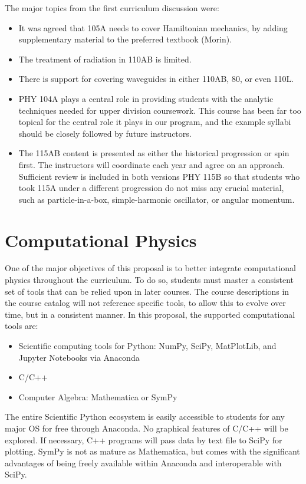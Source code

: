 \documentclass[12pt]{article}
\begin{document}
The major topics from the first curriculum discussion were:
\begin{itemize}
 \item It was agreed that 105A needs to cover Hamiltonian mechanics, by
   adding supplementary material to the preferred textbook (Morin).
 \item The treatment of radiation in 110AB is limited.
 \item There is support for covering waveguides in either 110AB, 80, or even 110L.   
 \item PHY 104A plays a central role in providing students with the
   analytic techniques needed for upper division coursework.  This
   course has been far too topical for the central role it plays in
   our program, and the example syllabi should be closely followed by
   future instructors.
 \item The 115AB content is presented as either the historical
   progression or spin first.  The instructors will coordinate each
   year and agree on an approach.  Sufficient review is included in
   both versions PHY 115B so that students who took 115A under a
   different progression do not miss any crucial material, such as
   particle-in-a-box, simple-harmonic oscillator, or angular momentum.

   
\end{itemize}

\section{Computational Physics}
\label{sec:computing}

One of the major objectives of this proposal is to better integrate
computational physics throughout the curriculum.  To do so, students
must master a consistent set of tools that can be relied upon in later
courses.  The course descriptions in the course catalog will not
reference specific tools, to allow this to evolve over time, but in a
consistent manner.  In this proposal, the supported computational
tools are:
\begin{itemize}
\item Scientific computing tools for Python: NumPy, SciPy, MatPlotLib,
  and Jupyter Notebooks via Anaconda
\item C/C++
\item Computer Algebra:  Mathematica or SymPy
\end{itemize}
The entire Scientific Python ecosystem is easily accessible to
students for any major OS for free through Anaconda.  No graphical
features of C/C++ will be explored.  If necessary, C++ programs will
pass data by text file to SciPy for plotting.  SymPy is not as mature
as Mathematica, but comes with the significant advantages of being
freely available within Anaconda and interoperable with SciPy.
\end{document}
